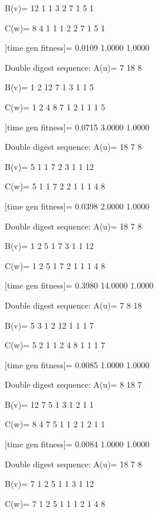 B(v)=
    12     1     1     3     2     7     1     5     1

C(w)=
     8     4     1     1     1     2     2     7     1     5     1

[time gen fitness]=
    0.0109    1.0000    1.0000

Double digest sequence:
A(u)=
     7    18     8

B(v)=
     1     2    12     7     1     3     1     1     5

C(w)=
     1     2     4     8     7     1     2     1     1     1     5

[time gen fitness]=
    0.0715    3.0000    1.0000

Double digest sequence:
A(u)=
    18     7     8

B(v)=
     5     1     1     7     2     3     1     1    12

C(w)=
     5     1     1     7     2     2     1     1     1     4     8

[time gen fitness]=
    0.0398    2.0000    1.0000

Double digest sequence:
A(u)=
    18     7     8

B(v)=
     1     2     5     1     7     3     1     1    12

C(w)=
     1     2     5     1     7     2     1     1     1     4     8

[time gen fitness]=
    0.3980   14.0000    1.0000

Double digest sequence:
A(u)=
     7     8    18

B(v)=
     5     3     1     2    12     1     1     1     7

C(w)=
     5     2     1     1     2     4     8     1     1     1     7

[time gen fitness]=
    0.0085    1.0000    1.0000

Double digest sequence:
A(u)=
     8    18     7

B(v)=
    12     7     5     1     3     1     2     1     1

C(w)=
     8     4     7     5     1     1     2     1     2     1     1

[time gen fitness]=
    0.0084    1.0000    1.0000

Double digest sequence:
A(u)=
    18     7     8

B(v)=
     7     1     2     5     1     1     3     1    12

C(w)=
     7     1     2     5     1     1     1     2     1     4     8

